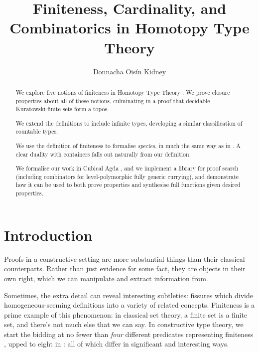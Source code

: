 
\title{Finiteness, Cardinality, and Combinatorics in Homotopy Type Theory}
\author{Donnacha Oisín Kidney}

\maketitle
\begin{abstract}
  We explore five notions of finiteness in Homotopy Type Theory \cite{hottbook}.
  We prove closure properties about all of these notions, culminating in a proof
  that decidable Kuratowski-finite sets form a topos.

  We extend the definitions to include infinite types, developing a similar
  classification of countable types.

  We use the definition of finiteness to formalise \emph{species}, in much
  the same way as in \cite{yorgeyCombinatorialSpeciesLabelled2014}.
  A clear duality with containers
  \cite{abbottContainersConstructingStrictly2005} falls out naturally from our
  definition.

  We formalise our work in Cubical Agda
  \cite{vezzosiCubicalAgdaDependently2019}, and we implement a library for proof
  search (including combinators for level-polymorphic fully generic currying),
  and demonstrate how it can be used to both prove properties and synthesise
  full functions given desired properties.
\end{abstract}
\section{Introduction}
Proofs in a constructive setting are more substantial things than their
classical counterparts.
Rather than just evidence for some fact, they are objects in their own right,
which we can manipulate and extract information from.

Sometimes, the extra detail can reveal interesting subtleties: fissures which
divide homogeneous-seeming definitions into a variety of related concepts.
Finiteness is a prime example of this phenomenon: in classical set theory, a
finite set is a finite set, and there's not much else that we can say.
In constructive type theory, we start the bidding at no fewer than \emph{four}
different predicates representing finiteness
\cite{spiwackConstructivelyFinite2010}, upped to eight in
\cite{firsovVariationsNoetherianness2016a}: all of which differ in significant
and interesting ways.

